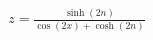 \documentclass[preview]{standalone}
\begin{document}
\begin{align*}
z = \frac{\sinh(2n)}{\cos(2x)+\cosh(2n)}
\end{align*}
\end{document}
